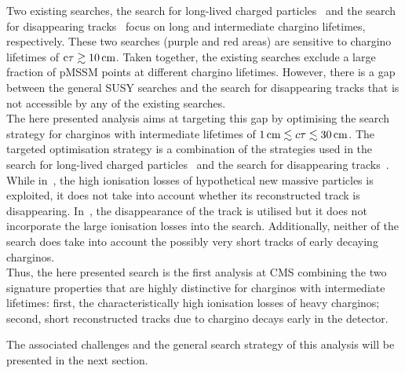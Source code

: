 Two existing searches, the search for long-lived charged particles~\cite{bib:CMS:HSCP_8TeV} and the search for disappearing tracks~\cite{bib:CMS:DT_8TeV} focus on long and intermediate chargino lifetimes, respectively. 
These two searches (purple and red areas) are sensitive to chargino lifetimes of $\text{c}\tau \gtrsim 10\,\text{cm}$.
Taken together, the existing searches exclude a large fraction of pMSSM points at different chargino lifetimes. 
However, there is a gap between the general SUSY searches and the search for disappearing tracks that is not accessible by any of the existing searches.\\

The here presented analysis aims at targeting this gap by optimising the search strategy for charginos with intermediate lifetimes of $1\,\text{cm} \lesssim c\tau \lesssim 30\,\text{cm}$. 
The targeted optimisation strategy is a combination of the strategies used in the search for long-lived charged particles~\cite{bib:CMS:HSCP_8TeV} and the search for disappearing tracks~\cite{bib:CMS:DT_8TeV}.
While in~\cite{bib:CMS:HSCP_8TeV}, the high ionisation losses of hypothetical new massive particles is exploited, it does not take into account whether its reconstructed track is disappearing.
In~\cite{bib:CMS:DT_8TeV}, the disappearance of the track is utilised but it does not incorporate the large ionisation losses into the search.
Additionally, neither of the search does take into account the possibly very short tracks of early decaying charginos.\\
\newpage
Thus, the here presented search is the first analysis at CMS combining the two signature properties that are highly distinctive for charginos with intermediate lifetimes: 
first, the characteristically high ionisation losses of heavy charginos;
second, short reconstructed tracks due to chargino decays early in the detector.

The associated challenges and the general search strategy of this analysis will be presented in the next section.

